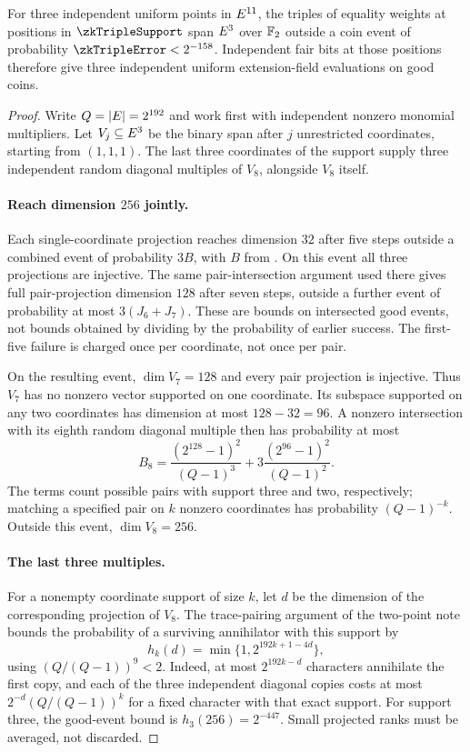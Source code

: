 \begin{theorem}\label{thm:zk-three-point-span}
For three independent uniform points in $E^{11}$, the triples of equality weights at positions in $\zkTripleSupport$ span $E^3$ over $\mathbb{F}_2$ outside a coin event of probability $\zkTripleError<2^{-158}$. Independent fair bits at those positions therefore give three independent uniform extension-field evaluations on good coins.
\end{theorem}
\begin{proof}
Write $Q=|E|=2^{192}$ and work first with independent nonzero monomial multipliers. Let $V_j\subseteq E^3$ be the binary span after $j$ unrestricted coordinates, starting from $(1,1,1)$. The last three coordinates of the support supply three independent random diagonal multiples of $V_8$, alongside $V_8$ itself.

\paragraph{Reach dimension $256$ jointly.} Each single-coordinate projection reaches dimension $32$ after five steps outside a combined event of probability $3B$, with $B$ from . On this event all three projections are injective. The same pair-intersection argument used there gives full pair-projection dimension $128$ after seven steps, outside a further event of probability at most $3(J_6+J_7)$. These are bounds on intersected good events, not bounds obtained by dividing by the probability of earlier success. The first-five failure is charged once per coordinate, not once per pair.

On the resulting event, $\dim V_7=128$ and every pair projection is injective. Thus $V_7$ has no nonzero vector supported on one coordinate. Its subspace supported on any two coordinates has dimension at most $128-32=96$. A nonzero intersection with its eighth random diagonal multiple then has probability at most
\[
 B_8=\frac{(2^{128}-1)^2}{(Q-1)^3}
      +3\frac{(2^{96}-1)^2}{(Q-1)^2}.
\]
The terms count possible pairs with support three and two, respectively; matching a specified pair on $k$ nonzero coordinates has probability $(Q-1)^{-k}$. Outside this event, $\dim V_8=256$.

\paragraph{The last three multiples.} For a nonempty coordinate support of size $k$, let $d$ be the dimension of the corresponding projection of $V_8$. The trace-pairing argument of the two-point note bounds the probability of a surviving annihilator with this support by
\[
 h_k(d)=\min\{1,2^{192k+1-4d}\},
\]
using $(Q/(Q-1))^9<2$. Indeed, at most $2^{192k-d}$ characters annihilate the first copy, and each of the three independent diagonal copies costs at most $2^{-d}(Q/(Q-1))^k$ for a fixed character with that exact support. For support three, the good-event bound is $h_3(256)=2^{-447}$. Small projected ranks must be averaged, not discarded.


\end{proof}
